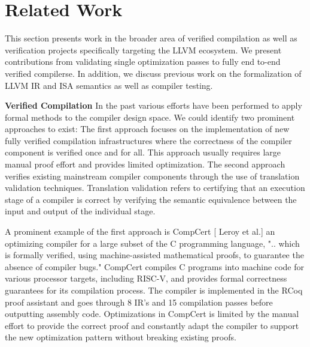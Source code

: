 \chapter{Related Work }
This section presents work in the broader area of verified compilation as well as verification projects specifically targeting the LLVM ecosystem. We present contributions from validating single optimization passes to fully end to-end verified compilerse. In addition, we discuss previous work on the formalization of LLVM IR and ISA semantics as well as compiler testing.

\textbf{Verified Compilation}
In the past various efforts have been performed to apply formal methods to the compiler design space. We could identify two prominent approaches to exist: The first approach focuses on the implementation of new fully verified compilation infrastructures where the correctness of the compiler component is verified once and for all. This approach usually requires large manual proof effort and provides limited optimization. The second approach verifies existing mainstream compiler components through the use of translation validation techniques. Translation validation refers to certifying that an execution stage of a compiler is correct by verifying the semantic equivalence between the input and output of the individual stage.  

A prominent example of the first approach is CompCert [ Leroy et al.] an optimizing compiler for a large subset of the C programming language, ".. which is formally verified, using machine-assisted mathematical proofs, to guarantee the absence of compiler bugs."  CompCert compiles C programs into machine code for various processor targets, including RISC-V, and provides formal correctness guarantees for its compilation process. The compiler is implemented in the RCoq proof assistant and goes through 8 IR's and 15 compilation passes before outputting assembly code. Optimizations in CompCert is limited by the manual effort to provide the correct proof and constantly adapt the compiler to support the new optimization pattern without breaking existing proofs. 

